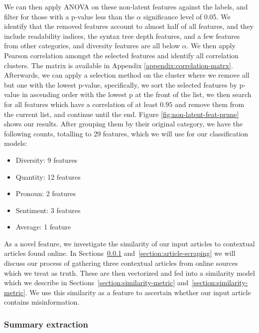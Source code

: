 \documentclass{article}
\begin{document}
We can then apply ANOVA on these non-latent features against the labels, and filter for those with a p-value less than the $\alpha$ significance level of 0.05. We identify that the removed features account to almost half of all features, and they include readability indices, the syntax tree depth features, and a few features from other categories, and diversity features are all below $\alpha$. We then apply Pearson correlation amongst the selected features and identify all correlation clusters. The matrix is available in Appendix \ref{appendix:correlation-matrx}. Afterwards, we can apply a selection method on the cluster where we remove all but one with the lowest p-value, specifically, we sort the selected features by p-value in ascending order with the lowest p at the front of the list, we then search for all features which have a correlation of at least $0.95$ and remove them from the current list, and continue until the end. Figure \ref{fig:non-latent-feat-prune} shows our results. After grouping them by their original category, we have the following counts, totalling to 29 features, which we will use for our classification models:
\begin{itemize}
  \item Diversity: 9 features
  \item Quantity: 12 features
  \item Pronoun: 2 features
  \item Sentiment: 3 features
  \item Average: 1 feature
\end{itemize}


As a novel feature, we investigate the similarity of our input articles to contextual articles found online. In Sections~\ref{section:summary-extraction} and~\ref{section:article-scraping} we will discuss our process of gathering three contextual articles from online sources which we treat as truth. These are then vectorized and fed into a similarity model which we describe in Sections~\ref{section:similarity-metric} and~\ref{section:similarity-metric}. We use this similarity as a feature to ascertain whether our input article contains misinformation.

\subsubsection{Summary extraction} \label{section:summary-extraction}
\end{document}
